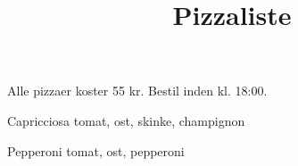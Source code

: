 

\title{Pizzaliste}
\date{}


\maketitle


Alle pizzaer koster 55 kr. Bestil inden kl. 18:00.

\begin{enumdescription}
\item[Capricciosa] tomat, ost, skinke, champignon
\item[Pepperoni] tomat, ost, pepperoni
\item {}
\end{enumdescription}




